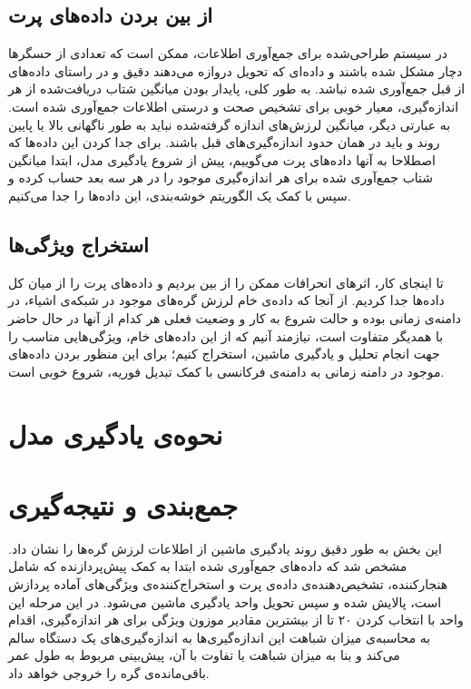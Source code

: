 \subsection{از بین بردن داده‌های پرت}
در سیستم طراحی‌شده برای جمع‌آوری اطلاعات، ممکن است که تعدادی از حسگرها دچار مشکل شده باشند و داده‌ای که تحویل دروازه می‌دهند دقیق و در راستای داده‌های از قبل جمع‌آوری شده نباشد. به طور کلی، پایدار بودن میانگین شتاب دریافت‌شده از هر اندازه‌گیری، معیار خوبی برای تشخیص صحت و درستی اطلاعات جمع‌‌آوری شده است\cite{jung2017vibration}. به عبارتی دیگر، میانگین لرزش‌های اندازه گرفته‌شده نباید به طور ناگهانی بالا یا پایین روند و باید در همان حدود اندازه‌گیری‌های قبل باشند. برای جدا کردن این داده‌ها که اصطلاحا به آنها داده‌های پرت می‌گوییم، پیش از شروع یادگیری مدل، ابتدا میانگین شتاب جمع‌‌آوری ‌شده برای هر اندازه‌گیری موجود را در هر سه بعد حساب کرده و سپس با کمک یک الگوریتم خوشه‌بندی، این داده‌ها را جدا می‌کنیم.



\subsection{استخراج ویژگی‌ها}
تا اینجای کار، اثرهای انحرافات ممکن را از بین بردیم و داده‌های پرت را از میان کل داده‌ها جدا کردیم. از آنجا که داده‌ی خام لرزش گره‌های موجود در شبکه‌ی اشیاء، در دامنه‌ی زمانی بوده و حالت شروع به کار و وضعیت فعلی هر کدام از آنها در حال حاضر با همدیگر متفاوت است، نیازمند آنیم که از این داده‌های خام، ویژگی‌هایی مناسب را جهت انجام تحلیل و یادگیری ماشین، استخراج کنیم؛ برای این منظور بردن داده‌های موجود در دامنه زمانی به دامنه‌ی فرکانسی با کمک تبدیل فوریه، شروع خوبی است.


\section{نحوه‌ی یادگیری مدل}


\section{جمع‌بندی و نتیجه‌گیری}
این بخش به طور دقیق روند یادگیری ماشین از اطلاعات لرزش گره‌ها را نشان داد. مشخص شد که داده‌های جمع‌آوری شده ابتدا به کمک پیش‌پردازنده که شامل هنجارکننده، تشخیص‌دهنده‌ی داده‌ی پرت و استخراج‌کننده‌ی ویژگی‌های آماده پردازش است، پالایش شده و سپس تحویل واحد یادگیری ماشین می‌شود. در این مرحله این واحد با انتخاب کردن ۲۰ تا از بیشترین مقادیر موزون ویژگی  برای هر اندازه‌گیری، اقدام به محاسبه‌ی میزان شباهت این اندازه‌گیری‌ها به اندازه‌گیری‌های یک دستگاه سالم می‌کند و بنا به میزان شباهت یا تفاوت با آن، پیش‌بینی مربوط به طول عمر باقی‌مانده‌ی گره را خروجی خواهد داد.